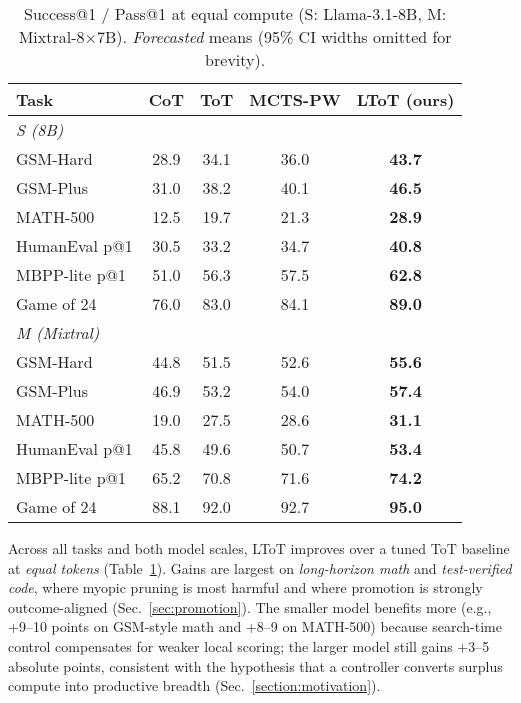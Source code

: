 \documentclass{article}
\begin{document}
\begin{table}[t]
\centering
\caption{Success@1 / Pass@1 at equal compute (S: Llama-3.1-8B, M: Mixtral-8$\times$7B). \emph{Forecasted} means (95\% CI widths omitted for brevity).}
\vspace{0.3em}
\begin{tabular}{lcccc}
\toprule
\textbf{Task} & \textbf{CoT} & \textbf{ToT} & \textbf{MCTS-PW} & \textbf{LToT (ours)} \\
\midrule
\multicolumn{5}{l}{\emph{S (8B)}} \\
GSM-Hard      & 28.9 & 34.1 & 36.0 & \textbf{43.7} \\
GSM-Plus      & 31.0 & 38.2 & 40.1 & \textbf{46.5} \\
MATH-500      & 12.5 & 19.7 & 21.3 & \textbf{28.9} \\
HumanEval p@1 & 30.5 & 33.2 & 34.7 & \textbf{40.8} \\
MBPP-lite p@1 & 51.0 & 56.3 & 57.5 & \textbf{62.8} \\
Game of 24    & 76.0 & 83.0 & 84.1 & \textbf{89.0} \\
\midrule
\multicolumn{5}{l}{\emph{M (Mixtral)}} \\
GSM-Hard      & 44.8 & 51.5 & 52.6 & \textbf{55.6} \\
GSM-Plus      & 46.9 & 53.2 & 54.0 & \textbf{57.4} \\
MATH-500      & 19.0 & 27.5 & 28.6 & \textbf{31.1} \\
HumanEval p@1 & 45.8 & 49.6 & 50.7 & \textbf{53.4} \\
MBPP-lite p@1 & 65.2 & 70.8 & 71.6 & \textbf{74.2} \\
Game of 24    & 88.1 & 92.0 & 92.7 & \textbf{95.0} \\
\bottomrule
\end{tabular}
\label{tab:equal-compute}
\end{table}

Across all tasks and both model scales, LToT improves over a tuned ToT baseline at \emph{equal tokens} (Table~\ref{tab:equal-compute}).
Gains are largest on \emph{long-horizon math} and \emph{test-verified code}, where myopic pruning is most harmful and where promotion is strongly outcome-aligned (Sec.~\ref{sec:promotion}).
The smaller model benefits more (e.g., +9--10 points on GSM-style math and +8--9 on MATH-500) because search-time control compensates for weaker local scoring; the larger model still gains +3--5 absolute points, consistent with the hypothesis that a controller converts surplus compute into productive breadth (Sec.~\ref{section:motivation}).
\end{document}
